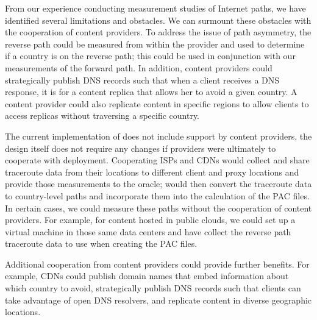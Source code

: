 From our experience conducting measurement studies of Internet paths, we have
identified several limitations and obstacles. We can surmount these obstacles with the cooperation of content providers. To
address the issue of path asymmetry, the reverse path could be measured from
within the provider and used to determine if a country is on the reverse path;
this could be used in conjunction with our measurements  of the forward path.
In addition, content providers could strategically publish DNS records such
that when a client receives a DNS response, it is for a content replica that
allows her to avoid a given country.  A content provider could also  replicate
content in specific regions to allow clients to access replicas without
traversing a specific  country.


The current implementation of \system{} does not include support by content
providers, the design itself does not require any changes if providers were
ultimately to cooperate with deployment. Cooperating ISPs and CDNs would
collect and share traceroute data from their locations to different client and
proxy locations and provide those measurements to the \system{} oracle;
\system{} would then convert the traceroute data to country-level paths and
incorporate them into the calculation of the  PAC files.  In certain cases, we
could measure these paths without the cooperation of content providers. For
example, for content hosted in public clouds, we could set up a virtual
machine in those same data centers and have  \system{} collect the reverse
path traceroute data to use when creating the PAC files.

Additional cooperation from content providers could provide further benefits.
For example, CDNs could publish domain names that embed information about
which country to avoid, strategically publish DNS records such  that clients
can take advantage of open DNS resolvers, and replicate content in diverse
geographic locations.

%
